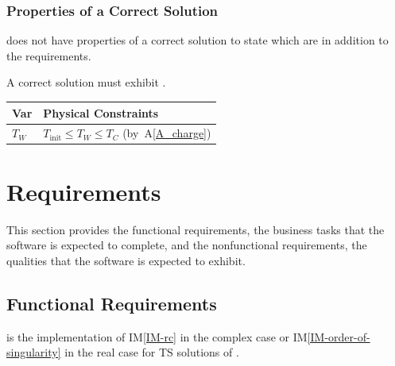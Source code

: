 \documentclass[12pt]{article}
\newcommand{\aref}[1]{A\ref{#1}}
\newcommand{\iref}[1]{IM\ref{#1}}
\begin{document}
\subsubsection{Properties of a Correct Solution} \label{sec_CorrectSolution}

 does not have properties of a correct solution to state which are in
addition to the requirements.

\plt
{
\noindent
A correct solution must exhibit .  

\begin{table}[!h]
\caption{Output Variables} \label{TblOutputVar}
\renewcommand{\arraystretch}{1.2}
\noindent \begin{longtable*}{l l} 
  \toprule
  \textbf{Var} & \textbf{Physical Constraints} \\
  \midrule 
  $T_W$ & $T_\text{init} \leq T_W \leq T_C$ (by~\aref{A_charge})
  \\
  \bottomrule
\end{longtable*}
\end{table}
}

\section{Requirements}\label{sc:requirements}


This section provides the functional requirements, the business tasks that the
software is expected to complete, and the nonfunctional requirements, the
qualities that the software is expected to exhibit.

\subsection{Functional Requirements}

 is the implementation of \iref{IM-rc} in the complex case or
\iref{IM-order-of-singularity} in the real case for TS solutions of \ode.
\end{document}
